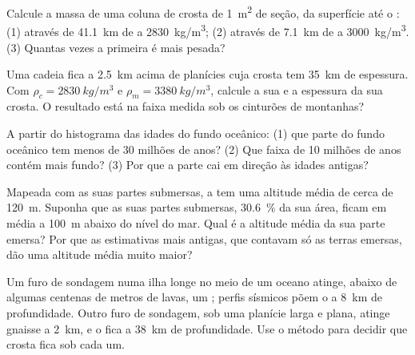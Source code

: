 \begin{exercise}[$\star\star$]\label{exo:g12:continental-crust:7}
Calcule a massa de uma coluna de crosta de \qty{1}{m^2} de seção, da
superfície até o : (1) através de \qty{41.1}{km} de 
a \qty{2830}{kg/m^3}; (2) através de \qty{7.1}{km} de  a
\qty{3000}{kg/m^3}. (3) Quantas vezes a primeira é mais pesada?
\end{exercise}

\begin{exercise}[$\star\star$]\label{exo:g12:continental-crust:8}
Uma cadeia fica a \qty{2.5}{km} acima de planícies cuja crosta tem
\qty{35}{km} de espessura. Com $\rho_c = \qty{2830}{kg/m^3}$ e $\rho_m =
\qty{3380}{kg/m^3}$, calcule a sua  e a espessura da sua crosta. O
resultado está na faixa medida sob os cinturões de montanhas?
\end{exercise}

\begin{exercise}[$\star\star$]\label{exo:g12:continental-crust:9}
A partir do histograma das idades do fundo oceânico: (1) que parte do fundo
oceânico tem menos de 30 milhões de anos? (2) Que faixa de 10 milhões de
anos contém mais fundo? (3) Por que a parte cai em direção às idades
antigas?
\end{exercise}

\begin{exercise}[$\star\star$]\label{exo:g12:continental-crust:10}
Mapeada com as suas partes submersas, a  tem uma altitude
média de cerca de \qty{120}{m}. Suponha que as suas partes submersas,
\qty{30.6}{\percent} da sua área, ficam em média a \qty{100}{m} abaixo do
nível do mar. Qual é a altitude média da sua parte emersa? Por que as
estimativas mais antigas, que contavam só as terras emersas, dão uma
altitude média muito maior?
\end{exercise}

\begin{exercise}[$\star\star$]\label{exo:g12:continental-crust:11}
Um furo de sondagem numa ilha longe no meio de um oceano atinge, abaixo de
algumas centenas de metros de lavas, um ; perfis sísmicos põem o  a
\qty{8}{km} de profundidade. Outro furo de sondagem, sob uma planície larga e
plana, atinge gnaisse a \qty{2}{km}, e o  fica a \qty{38}{km} de
profundidade. Use o método para decidir que crosta fica sob cada um.
\end{exercise}

